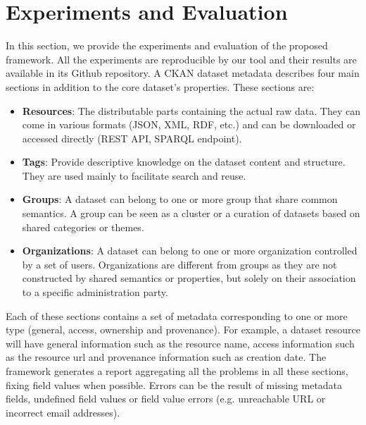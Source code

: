 \documentclass[runningheads,a4paper]{llncs}
\begin{document}

\section{Experiments and Evaluation}
\label{sec:experiment}
In this section, we provide the experiments and evaluation of the proposed framework. All the experiments are reproducible by our tool and their results are available in its Github repository. A CKAN dataset metadata describes four main sections in addition to the core dataset's properties. These sections are:
\begin{itemize}
  \item \textbf{Resources}: The distributable parts containing the actual raw data. They can come in various formats (JSON, XML, RDF, etc.) and can be downloaded or accessed directly (REST API, SPARQL endpoint).
  \item \textbf{Tags}: Provide descriptive knowledge on the dataset content and structure. They are used mainly to facilitate search and reuse.
  \item \textbf{Groups}: A dataset can belong to one or more group that share common semantics. A group can be seen as a cluster or a curation of datasets based on shared categories or themes.
  \item \textbf{Organizations}: A dataset can belong to one or more organization controlled by a set of users. Organizations are different from groups as they are not constructed by shared semantics or properties, but solely on their association to a specific administration party.
\end{itemize}

Each of these sections contains a set of metadata corresponding to one or more type (general, access, ownership and provenance). For example, a dataset resource will have general information such as the resource name, access information such as the resource url and provenance information such as creation date. The framework generates a report aggregating all the problems in all these sections, fixing field values when possible. Errors can be the result of missing metadata fields, undefined field values or field value errors (e.g. unreachable URL or incorrect email addresses).
\end{document}
